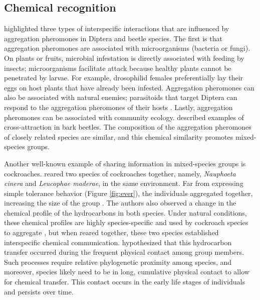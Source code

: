 		\subsection{Chemical recognition}
\citet{wertheim_evolutionary_2005} highlighted three types of interspecific interactions that are influenced by aggregation pheromones in Diptera and beetle species. The first is that aggregation pheromones are associated with microorganisms (bacteria or fungi). On plants or fruits, microbial infestation is directly associated with feeding by insects; microorganisms facilitate attack because healthy plants cannot be penetrated by larvae. For example, drosophilid females preferentially lay their eggs on host plants that have already been infested. Aggregation pheromones can also be associated with natural enemies; parasitoids that target Diptera can respond to the aggregation pheromones of their hosts \cite{wertheim_evolutionary_2005}. Lastly, aggregation pheromones can be associated with community ecology. \citet{wertheim_evolutionary_2005} described examples of cross-attraction in bark beetles. The composition of the aggregation pheromones of closely related species are similar, and this chemical similarity promotes mixed-species groups.

Another well-known example of sharing information in mixed-species groups is cockroaches. \citet{everaerts_changes_1997} reared two species of cockroaches together, namely, \textit{Nauphoeta cinera} and \textit{Leucophae maderae}, in the same environment. Far from expressing simple tolerance behavior (Figure \ref{fig:ever}), the individuals aggregated together, increasing the size of the group \cite{everaerts_changes_1997}. The authors also observed a change in the chemical profile of the hydrocarbons in both species. Under natural conditions, these chemical profiles are highly species-specific and used by cockroach species to aggregate \cite{lihoreau_kin_2009}, but when reared together, these two species established interspecific chemical communication. \citet{everaerts_changes_1997} hypothesized that this hydrocarbon transfer occurred during the frequent physical contact among group members. Such processes require relative phylogenetic proximity among species, and moreover, species likely need to be in long, cumulative physical contact to allow for chemical transfer. This contact occurs in the early life stages of individuals and persists over time. 

